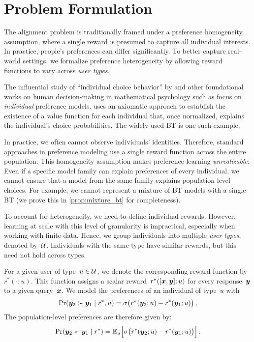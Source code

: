 \section{Problem Formulation}
\label{sec:formulation}

The alignment problem is traditionally framed under a preference homogeneity assumption, where a single reward is presumed to capture all individual interests. In practice, people's preferences can differ significantly. To better capture real-world settings, we formalize preference heterogeneity by allowing reward functions to vary across \emph{user types}. 

The influential study of ``individual choice behavior'' by \citet{luce1959individual} and other foundational works on human decision-making in mathematical psychology such as \citet{shepard_stimulus_1957}  focus on \emph{individual} preference models. \citet{luce1959individual} uses an axiomatic approach to establish the existence of a value function for each individual that, once normalized, explains the individual's choice probabilities. The widely used BT is one such example. 

In practice, we often cannot observe individuals' identities. Therefore, standard approaches in preference modeling use a single reward function across the entire population. This homogeneity assumption makes preference learning \emph{unrealizable}: Even if a specific model family can explain preferences of every individual, we cannot ensure that a model from the same family explains population-level choices. For example, we cannot represent a mixture of BT models with a single BT (we prove this in \cref{prop:mixture_bt} for completeness).

To account for heterogeneity, we need to define individual rewards. However, learning at scale with this level of granularity is impractical, especially when working with finite data. Hence, we group individuals into multiple \emph{user types}, denoted by~${\mathcal{U}}$. Individuals with the same type have similar rewards, but this need not hold across types. 

For a given user of type~$u \in {\mathcal{U}}$, we denote the corresponding reward function by~$r^*(\cdot; u)$. This function assigns a scalar reward~$r^*([{\bm{x}}, {\bm{y}}]; u)$ for every response~${\bm{y}}$ to a given query~${\bm{x}}$. We model the preferences of an individual of type~$u$ with
%
\begin{equation}
\label{eq:heter_BT}
    \Pr({\bm{y}}_2 \succ {\bm{y}}_1 \mid r^*, u) = \sigma\big(r^*({\bm{y}}_2; u) - r^*({\bm{y}}_1; u)\big)
    \,,
\end{equation}
The population-level preferences are therefore given by: 
\begin{equation}
\label{eq:heter_marginal_BT}
    \Pr({\bm{y}}_2 \succ {\bm{y}}_1 \mid r^*) = \mathbb{E}_u\Big[\sigma\big(r^*({\bm{y}}_2; u) - r^*({\bm{y}}_1; u)\big)\Big]
    \,.
\end{equation}
%

